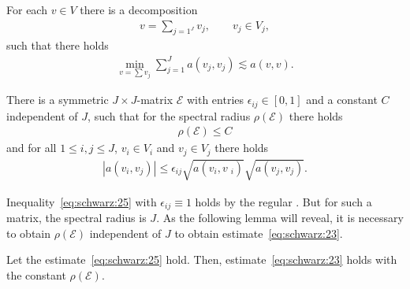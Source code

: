 \begin{assumption}
  \label{assumption:schwarz:stable-decomposition}
  For each $v\in V$ there is a decomposition
  \begin{gather*}
    v = \sum_{j=1^J} v_j, \qquad v_j\in V_j,
  \end{gather*}
  such that there holds
  \begin{gather}
    \label{eq:schwarz:24}
     \min_{v=\sum v_j}\sum_{j=1}^J a(v_j, v_j) \lesssim a(v,v).
  \end{gather}  
\end{assumption}

\begin{assumption}
  \label{assumption:schwarz:1}
   There is a symmetric $J\times J$-matrix
  $\mathcal E$ with entries $\epsilon_{ij} \in [0,1]$ and a constant
  $C$ independent of $J$, such that for the spectral radius
  $\rho(\mathcal E)$ there holds
  \begin{gather*}
    \rho(\mathcal E) \le C
  \end{gather*}
  and for all $1 \le i,j \le J$, $v_i \in V_i$ and $v_j \in V_j$ there
  holds
  \begin{gather}
    \label{eq:schwarz:25}
    \left| a(v_i, v_j)\right|
    \le \epsilon_{ij} \sqrt{a(v_i,v_{\phantom ji})} \sqrt{a(v_j,v_j)}.
  \end{gather}
\end{assumption}

\begin{note}
  Inequality~\eqref{eq:schwarz:25} with $\epsilon_{ij} \equiv 1$ holds by the
  regular .
  But for such a matrix, the
  spectral radius is $J$. As the following lemma will reveal, it is
  necessary to obtain $\rho(\mathcal E)$ independent of $J$ to obtain
  estimate~\eqref{eq:schwarz:23}.
\end{note}

\begin{lemma}
  \label{lemma:schwarz:7}
  Let the estimate~\eqref{eq:schwarz:25} hold. Then,
  estimate~\eqref{eq:schwarz:23} holds with the constant
  $\rho(\mathcal E)$.
\end{lemma}


